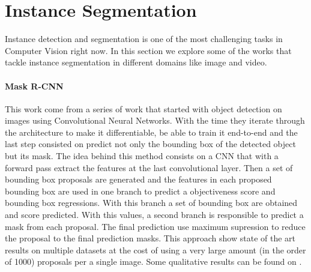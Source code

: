 

\section{Instance Segmentation}
\label{sec:soa_instancesegmentation}

Instance detection and segmentation is one of the most challenging tasks in Computer Vision right now.
In this section we explore some of the works that tackle instance segmentation in different domains like image and video.

\paragraph{Mask R-CNN~\cite{he2017mask}}
This work come from a series of work that started with object detection on images using Convolutional Neural Networks.
With the time they iterate through the architecture to make it differentiable, be able to train it end-to-end and the last step consisted on predict not only the bounding box of the detected object but its mask.
The idea behind this method consists on a CNN that with a forward pass extract the features at the last convolutional layer.
Then a set of bounding box proposals are generated and the features in each proposed bounding box are used in one branch to predict a objectiveness score and bounding box regressions.
With this branch a set of bounding box are obtained and score predicted. With this values, a second branch is responsible to predict a mask from each proposal.
The final prediction use maximum supression to reduce the proposal to the final prediction masks.
This approach show state of the art results on multiple datasets at the cost of using a very large amount (in the order of 1000) proposals per a single image.
Some qualitative results can be found on .


